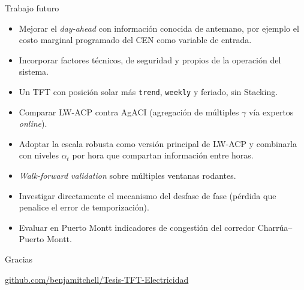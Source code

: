 \documentclass[aspectratio=169]{beamer}
\begin{document}
\begin{frame}{Trabajo futuro}
    \begin{itemize}
        \item Mejorar el \textit{day-ahead} con información conocida de antemano, por ejemplo el costo marginal programado del CEN como variable de entrada.
        \item Incorporar factores técnicos, de seguridad y propios de la operación del sistema.
        \item Un TFT con posición solar más \texttt{trend}, \texttt{weekly} y feriado, sin Stacking.
        \item Comparar LW-ACP contra AgACI (agregación de múltiples $\gamma$ vía expertos \textit{online}).
        \item Adoptar la escala robusta como versión principal de LW-ACP y combinarla con niveles $\alpha_t$ por hora que compartan información entre horas.
        \item \textit{Walk-forward validation} sobre múltiples ventanas rodantes.
        \item Investigar directamente el mecanismo del desfase de fase (pérdida que penalice el error de temporización).
        \item Evaluar en Puerto Montt indicadores de congestión del corredor Charrúa--Puerto Montt.
    \end{itemize}
\end{frame}

\begin{frame}
    \centering
    \Huge Gracias

    \vspace{1em}
    \normalsize
    \url{github.com/benjamitchell/Tesis-TFT-Electricidad}
\end{frame}
\end{document}
